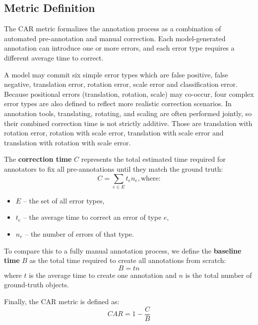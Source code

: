 \documentclass[conference]{IEEEtran}
\begin{document}
\subsection{Metric Definition}

The CAR metric formalizes the annotation process as a combination of automated pre-annotation and manual correction. Each model-generated annotation can introduce one or more errors, and each error type requires a different average time to correct.

A model may commit six simple error types which are false positive, false negative, translation error, rotation error, scale error and classification error. Because positional errors (translation, rotation, scale) may co-occur, four complex error types are also defined to reflect more realistic correction scenarios. In annotation tools, translating, rotating, and scaling are often performed jointly, so their combined correction time is not strictly additive. Those are translation with rotation error, rotation with scale error, translation with scale error and translation with rotation with scale error.

The \textbf{correction time} $C$ represents the total estimated time required for annotators to fix all pre-annotations until they match the ground truth:
\begin{equation}
    C = \sum_{e \in E} t_e n_e, \text{where:}
    \label{eq:correction_time}
\end{equation}
\begin{itemize}
    \item $E$ – the set of all error types,
    \item $t_e$ – the average time to correct an error of type $e$,
    \item $n_e$ – the number of errors of that type.
\end{itemize}

To compare this to a fully manual annotation process, we define the \textbf{baseline time} $B$ as the total time required to create all annotations from scratch:
\begin{equation}
    B = t n
    \label{eq:baseline_time}
\end{equation}
where $t$ is the average time to create one annotation and $n$ is the total number of ground-truth objects.

Finally, the CAR metric is defined as:
\begin{equation}
    CAR = 1 - \frac{C}{B}
    \label{eq:car_definition}
\end{equation}
\end{document}
